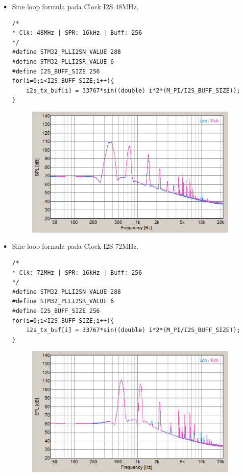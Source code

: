 \documentclass[12pt,]{article}
\begin{document}
\begin{itemize}
\begin{itemize}
			\newpage
			\item Sine loop formula pada Clock I2S 48MHz.
			\begin{verbatim}
/*
* Clk: 48MHz | SPR: 16kHz | Buff: 256
*/
#define STM32_PLLI2SN_VALUE 288
#define STM32_PLLI2SR_VALUE 6
#define I2S_BUFF_SIZE 256	
for(i=0;i<I2S_BUFF_SIZE;i++){
	i2s_tx_buf[i] = 33767*sin((double) i*2*(M_PI/I2S_BUFF_SIZE));
}
			\end{verbatim}
			\begin{figure}[H]
				\centering
				\includegraphics[width=0.5\linewidth]{result/sine_clk48}
			\end{figure}
		
			\item Sine loop formula pada Clock I2S 72MHz.
			\begin{verbatim}
/*
* Clk: 72MHz | SPR: 16kHz | Buff: 256
*/
#define STM32_PLLI2SN_VALUE 288
#define STM32_PLLI2SR_VALUE 6
#define I2S_BUFF_SIZE 256	
for(i=0;i<I2S_BUFF_SIZE;i++){
	i2s_tx_buf[i] = 33767*sin((double) i*2*(M_PI/I2S_BUFF_SIZE));
}
			\end{verbatim}
			\begin{figure}[H]
				\centering
				\includegraphics[width=0.5\linewidth]{result/sine_clk72}
			\end{figure}
			

\end{itemize}
\end{itemize}
\end{document}
